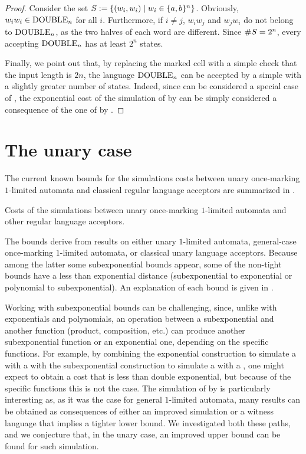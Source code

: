 \begin{proof}
	Consider the set $S:=\{(w_i,w_i)\mid w_i\in\{a,b\}^n\}$.
	Obviously, $w_iw_i\in\mathrm{DOUBLE}_n$ for all $i$.
	Furthermore, if $i\ne j$, $w_iw_j$ and $w_jw_i$ do not belong to $\mathrm{DOUBLE}_n$, as the two halves of each word are different.
	Since $\# S=2^n$, every \ONFA accepting $\mathrm{DOUBLE}_n$ has at least $2^n$ states.

	Finally, we point out that, by replacing the marked cell with a simple check that the input length is $2n$, the language $\mathrm{DOUBLE}_n$ can be accepted by a simple \TDFA with a slightly greater number of states.
	Indeed, since \TDFA can be considered a special case of \OMODLA, the exponential cost of the simulation of \OMODLA by \ONFA can be simply considered a consequence of the one of \TDFA by \ONFA.
\end{proof}



\section{The unary case}\label{sec:oncemarking-unary}
The current known bounds for the simulations costs between unary once-marking $1$-limited automata and classical regular language acceptors are summarized in .

\begin{table}
	\caption{Costs of the simulations between unary once-marking $1$-limited automata and other regular language acceptors.}
	\label{tab:sims-om-unary-oncemarking}
\end{table}

The bounds derive from results on either unary $1$-limited automata, general-case once-marking $1$-limited automata, or classical unary language acceptors.
Because among the latter some subexponential bounds appear, some of the non-tight bounds have a less than exponential distance (subexponential to exponential or polynomial to subexponential).
An explanation of each bound is given in .

Working with subexponential bounds can be challenging, since, unlike with exponentials and polynomials, an operation between a subexponential and another function (product, composition, etc.) can produce another subexponential function or an exponential one, depending on the specific functions.
For example, by combining the exponential construction to simulate a \OLA with a \ONFA with the subexponential construction to simulate a \ONFA with a \ODFA, one might expect to obtain a cost that is less than double exponential, but because of the specific functions this is not the case.
The simulation of \OMOLA by \ODFA is particularly interesting as, as it was the case for general $1$-limited automata, many results can be obtained as consequences of either an improved simulation or a witness language that implies a tighter lower bound.
We investigated both these paths, and we conjecture that, in the unary case, an improved upper bound can be found for such simulation.



